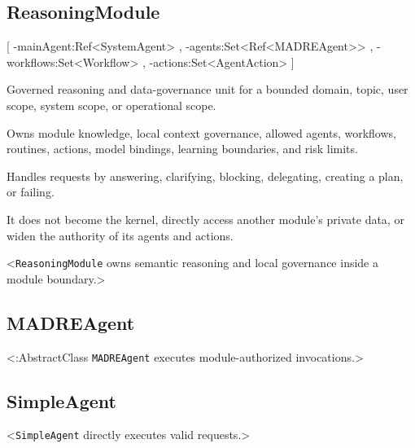 \documentclass[11pt]{report}
\begin{document}
\subsection{ReasoningModule}
[
	\UMLAt-mainAgent:Ref<SystemAgent> ,
	\UMLAt-agents:Set<Ref<MADREAgent>> ,
	\UMLAt-workflows:Set<Workflow> ,
	\UMLAt-actions:Set<AgentAction>
]{%
	\item[] Governed reasoning and data-governance unit for a bounded domain, topic, user scope, system scope, or operational scope.
	\item[] Owns module knowledge, local context governance, allowed agents, workflows, routines, actions, model bindings, learning boundaries, and risk limits.
	\item[] Handles requests by answering, clarifying, blocking, delegating, creating a plan, or failing.
	\item[] It does not become the kernel, directly access another module's private data, or widen the authority of its agents and actions.
}<\texttt{ReasoningModule} owns semantic reasoning and local governance inside a module boundary.>

\subsection{MADREAgent}
<\umltag:AbstractClass \texttt{MADREAgent} executes module-authorized invocations.>

\subsection{SimpleAgent}
<\texttt{SimpleAgent} directly executes valid requests.>
\end{document}
